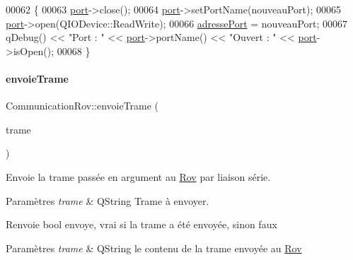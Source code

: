 \begin{DoxyCode}
00062 \{
00063     \hyperlink{class_communication_rov_a21b62067ef0b2a6aec339df60b4abd72}{port}->close();
00064     \hyperlink{class_communication_rov_a21b62067ef0b2a6aec339df60b4abd72}{port}->setPortName(nouveauPort);
00065     \hyperlink{class_communication_rov_a21b62067ef0b2a6aec339df60b4abd72}{port}->open(QIODevice::ReadWrite);
00066     \hyperlink{class_communication_rov_a7bd5d36d065005b27ed6cb421c7ffe42}{adressePort} = nouveauPort;
00067     qDebug() << \textcolor{stringliteral}{"Port : "} << \hyperlink{class_communication_rov_a21b62067ef0b2a6aec339df60b4abd72}{port}->portName() << \textcolor{stringliteral}{"Ouvert : "} << \hyperlink{class_communication_rov_a21b62067ef0b2a6aec339df60b4abd72}{port}->isOpen();
00068 \}
\end{DoxyCode}
\mbox{\label{class_communication_rov_ac243fcfb073f4ceaf58fab1d41207801}} 
\paragraph{\texorpdfstring{envoie\+Trame}{envoieTrame}}
{\footnotesize\ttfamily Communication\+Rov\+::envoie\+Trame (\begin{DoxyParamCaption}\item[{Q\+String}]{trame }\end{DoxyParamCaption})\hspace{0.3cm}{\ttfamily [slot]}}

Envoie la trame passée en argument au \hyperlink{class_rov}{Rov} par liaison série.


\begin{DoxyParams}{Paramètres}
{\em trame} & Q\+String Trame à envoyer. \\
\hline
\end{DoxyParams}
\begin{DoxyReturn}{Renvoie}
bool envoye, vrai si la trame a été envoyée, sinon faux
\end{DoxyReturn}

\begin{DoxyParams}{Paramètres}
{\em trame} & Q\+String le contenu de la trame envoyée au \hyperlink{class_rov}{Rov} \\
\hline
\end{DoxyParams}


